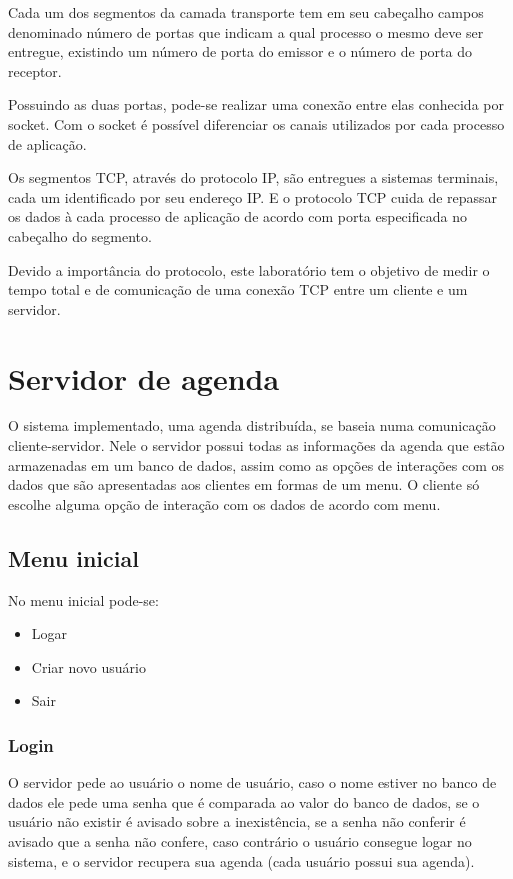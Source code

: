 \documentclass[10pt,a4paper]{article}
\begin{document}
Cada um dos segmentos da camada transporte tem em seu cabeçalho campos
denominado número de portas que indicam a qual processo o mesmo deve
ser entregue, existindo um número de porta do emissor e o número de porta do
receptor. 

Possuindo as duas portas, pode-se realizar uma conexão entre elas
conhecida por socket. Com o socket é possível diferenciar os canais
utilizados por cada processo de aplicação.

Os segmentos TCP, através do protocolo IP, são entregues a sistemas terminais, cada um
identificado por seu endereço IP. E o protocolo TCP cuida de repassar
os dados à cada processo de aplicação de acordo com porta especificada no
cabeçalho do segmento.

Devido a importância do protocolo, este laboratório tem o objetivo de
medir o tempo total e de comunicação de uma conexão TCP entre um
cliente e um servidor.

\section{Servidor de agenda}
O sistema implementado, uma agenda distribuída, se baseia numa comunicação
cliente-servidor. Nele o servidor possui todas as informações da
agenda que estão armazenadas em um banco de dados,
assim como as opções de interações com os dados que são apresentadas
aos clientes em formas de um menu.
O cliente só escolhe alguma opção de interação com os dados de
acordo com menu.


\subsection{Menu inicial}
No menu inicial pode-se:

\begin{itemize}
\item Logar
\item Criar novo usuário
\item Sair
\end{itemize}

\subsubsection{Login}
O servidor pede ao usuário o nome de usuário, caso o nome estiver no
banco de dados ele pede uma senha que é comparada ao valor do banco de
dados, se o usuário não existir é avisado sobre a inexistência, se a
senha não conferir é avisado que a senha não confere, caso contrário o
usuário consegue logar no sistema, e o servidor recupera sua agenda (cada
usuário possui sua agenda).
\end{document}
